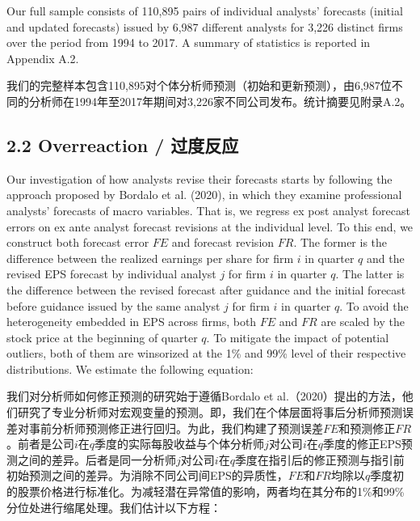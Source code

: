 \documentclass[12pt,a4paper]{article}
\newenvironment{original}
  {\par\medskip\noindent\ignorespaces}
  {\par\medskip}
\newenvironment{translation}
  {\par\noindent{\color{transblue}\ignorespaces}}
  {\par\bigskip}
\begin{document}
\begin{original}
Our full sample consists of 110,895 pairs of individual analysts' forecasts (initial and updated forecasts) issued by 6,987 different analysts for 3,226 distinct firms over the period from 1994 to 2017. A summary of statistics is reported in Appendix A.2.
\end{original}
\begin{translation}
我们的完整样本包含110,895对个体分析师预测（初始和更新预测），由6,987位不同的分析师在1994年至2017年期间对3,226家不同公司发布。统计摘要见附录A.2。
\end{translation}

\subsection{2.2 Overreaction / 过度反应}

\begin{original}
Our investigation of how analysts revise their forecasts starts by following the approach proposed by Bordalo et al. (2020), in which they examine professional analysts' forecasts of macro variables. That is, we regress ex post analyst forecast errors on ex ante analyst forecast revisions at the individual level. To this end, we construct both forecast error $FE$ and forecast revision $FR$. The former is the difference between the realized earnings per share for firm $i$ in quarter $q$ and the revised EPS forecast by individual analyst $j$ for firm $i$ in quarter $q$. The latter is the difference between the revised forecast after guidance and the initial forecast before guidance issued by the same analyst $j$ for firm $i$ in quarter $q$. To avoid the heterogeneity embedded in EPS across firms, both $FE$ and $FR$ are scaled by the stock price at the beginning of quarter $q$. To mitigate the impact of potential outliers, both of them are winsorized at the 1\% and 99\% level of their respective distributions. We estimate the following equation:
\end{original}
\begin{translation}
我们对分析师如何修正预测的研究始于遵循Bordalo et al.（2020）提出的方法，他们研究了专业分析师对宏观变量的预测。即，我们在个体层面将事后分析师预测误差对事前分析师预测修正进行回归。为此，我们构建了预测误差$FE$和预测修正$FR$。前者是公司$i$在$q$季度的实际每股收益与个体分析师$j$对公司$i$在$q$季度的修正EPS预测之间的差异。后者是同一分析师$j$对公司$i$在$q$季度在指引后的修正预测与指引前初始预测之间的差异。为消除不同公司间EPS的异质性，$FE$和$FR$均除以$q$季度初的股票价格进行标准化。为减轻潜在异常值的影响，两者均在其分布的1\%和99\%分位处进行缩尾处理。我们估计以下方程：
\end{translation}
\end{document}
